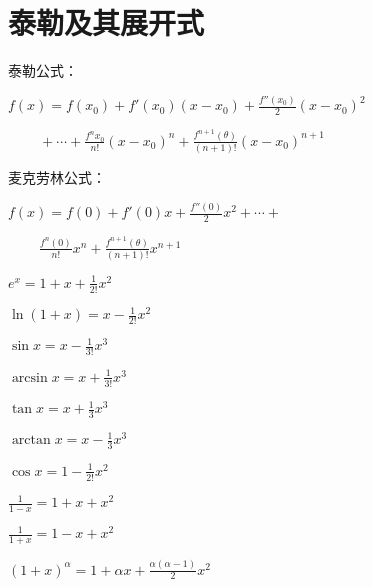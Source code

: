 \section{泰勒及其展开式}

{
    \noindent 泰勒公式：

    $\displaystyle f(x) = f(x_0) + f'(x_0)(x-x_0) + \frac{f''(x_0)}{2} (x-x_0)^2$

    $\displaystyle \qquad \  + \cdots + \frac{f^{n}x_0}{n!} (x-x_0)^n + \frac{f^{n+1}(\theta)}{(n+1)!}(x - x_0)^{n+1}$
}


{
    \noindent 麦克劳林公式：

    $\displaystyle f(x) = f(0) + f'(0)x + \frac{f''(0)}{2} x^2 + \cdots +$

    $\displaystyle \qquad \ \frac{f^{n}(0)}{n!} x^n + \frac{f^{n+1}(\theta)}{(n+1)!}x^{n+1}$
}

\begin{multicols}{2}
    \begin{spacing}{\hangju}
        \noindent $e^x = 1 + x + \frac{1}{2!}x^2$

        \noindent $\ln{(1 + x)} = x - \frac{1}{2!}x^2$

        \noindent $\sin{x} = x - \frac{1}{3!}x^{3}$

        \noindent $\arcsin{x} = x + \frac{1}{3!}x^{3}$

        \noindent $\tan{x} = x + \frac{1}{3}x^3$

        \noindent $\arctan{x} = x - \frac{1}{3}x^3$

        \noindent $\cos{x} = 1 - \frac{1}{2!}x^2$

        \noindent $\frac{1}{1 - x} = 1 + x + x^2$

        \noindent $\frac{1}{1 + x} = 1 - x + x^2$

        \noindent $(1 + x)^\alpha = 1 + \alpha x + \frac{\alpha(\alpha - 1)}{2}x^2$
    \end{spacing}
\end{multicols}

